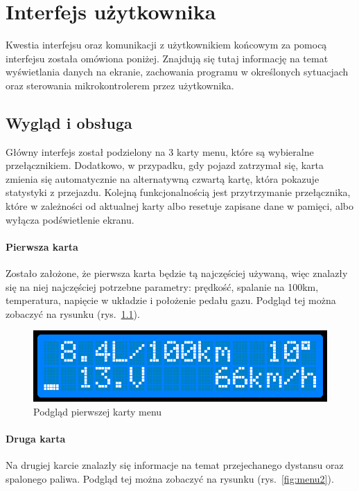 \chapter{Interfejs użytkownika}
\par Kwestia interfejsu oraz komunikacji z użytkownikiem końcowym za pomocą interfejsu została omówiona poniżej. Znajdują się tutaj informację na temat wyświetlania danych na ekranie, zachowania programu w określonych sytuacjach oraz sterowania mikrokontrolerem przez użytkownika.
\section{Wygląd i obsługa}

\par Główny interfejs został podzielony na 3 karty menu, które są wybieralne przełącznikiem. Dodatkowo, w przypadku, gdy pojazd zatrzymał się, karta zmienia się automatycznie na alternatywną czwartą kartę, która pokazuje statystyki z przejazdu. Kolejną funkcjonalnością jest przytrzymanie przełącznika, które w zależności od aktualnej karty albo resetuje zapisane dane w pamięci, albo wyłącza podświetlenie ekranu.

\subsubsection{Pierwsza karta}

Zostało założone, że pierwsza karta będzie tą najczęściej używaną, więc znalazły się na niej najczęściej potrzebne parametry: prędkość, spalanie na 100km, temperatura, napięcie w układzie i położenie pedału gazu. Podgląd tej można zobaczyć na rysunku (rys.~\ref{fig:menu1}).

\begin{figure}[!htb]
\centering
\includegraphics[width=0.7\linewidth]{Rysunki/menu1.png}
\caption{Podgląd pierwszej karty menu}
\label{fig:menu1}
\end{figure}

\subsubsection{Druga karta}
Na drugiej karcie znalazły się informacje na temat przejechanego dystansu oraz spalonego paliwa. Podgląd tej można zobaczyć na rysunku (rys.~\ref{fig:menu2}).

